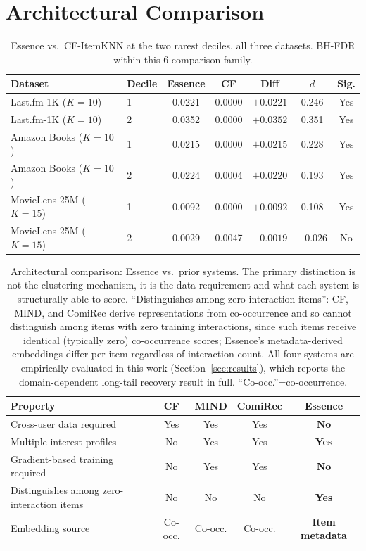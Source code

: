 \documentclass{article}
\begin{document}
\section{Architectural Comparison}
\label{app:comparison}

\begin{table}[h]
\centering
\caption{Essence vs.\ CF-ItemKNN at the two rarest deciles, all three datasets. BH-FDR within this 6-comparison family.}
\label{tab:coldstart}
\small
\begin{tabular}{llccccc}
\toprule
\textbf{Dataset} & \textbf{Decile} & \textbf{Essence} & \textbf{CF} & \textbf{Diff} & $d$ & \textbf{Sig.} \\
\midrule
Last.fm-1K ($K{=}10$) & 1 & 0.0221 & 0.0000 & $+0.0221$ & 0.246 & Yes \\
Last.fm-1K ($K{=}10$) & 2 & 0.0352 & 0.0000 & $+0.0352$ & 0.351 & Yes \\
Amazon Books ($K{=}10$) & 1 & 0.0215 & 0.0000 & $+0.0215$ & 0.228 & Yes \\
Amazon Books ($K{=}10$) & 2 & 0.0224 & 0.0004 & $+0.0220$ & 0.193 & Yes \\
MovieLens-25M ($K{=}15$) & 1 & 0.0092 & 0.0000 & $+0.0092$ & 0.108 & Yes \\
MovieLens-25M ($K{=}15$) & 2 & 0.0029 & 0.0047 & $-0.0019$ & $-0.026$ & No \\
\bottomrule
\end{tabular}
\end{table}


\begin{table}[H]
\centering
\caption{Architectural comparison: Essence vs.\ prior systems. The primary distinction is not the clustering mechanism, it is the data requirement and what each system is structurally able to score. ``Distinguishes among zero-interaction items'': CF, MIND, and ComiRec derive representations from co-occurrence and so cannot distinguish among items with zero training interactions, since such items receive identical (typically zero) co-occurrence scores; Essence's metadata-derived embeddings differ per item regardless of interaction count. All four systems are empirically evaluated in this work (Section~\ref{sec:results}), which reports the domain-dependent long-tail recovery result in full. ``Co-occ.''=co-occurrence.}
\label{tab:comparison}
\small
\begin{tabular}{@{}p{}cccc@{}}
\toprule
\textbf{Property} & \textbf{CF} & \textbf{MIND} & \textbf{ComiRec} & \textbf{Essence} \\
\midrule
Cross-user data required & Yes & Yes & Yes & \textbf{No} \\
Multiple interest profiles & No & Yes & Yes & \textbf{Yes} \\
Gradient-based training required & No & Yes & Yes & \textbf{No} \\
Distinguishes among zero-interaction items & No & No & No & \textbf{Yes} \\
Embedding source & Co-occ. & Co-occ. & Co-occ. & \textbf{Item metadata} \\
\bottomrule
\end{tabular}
\end{table}
\end{document}
